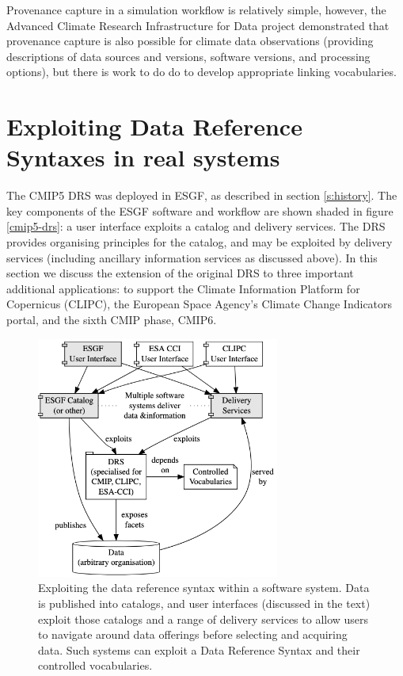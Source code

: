 \documentclass[final,1p,times,twocolumn,authoryear]{elsarticle}
\begin{document}
Provenance capture in a simulation workflow is relatively simple, however,
the Advanced Climate Research Infrastructure for Data \citep[ACRID, ][]{Shaon2012} project demonstrated that provenance capture is also possible for climate data observations (providing descriptions of data sources and versions, software versions, and processing options), but there is work to do do to develop appropriate linking vocabularies.
 

\section{Exploiting Data Reference Syntaxes in real systems}

The CMIP5 DRS was deployed in ESGF, as described in section \ref{s:history}. The key components of the ESGF software and workflow are shown shaded in figure \ref{cmip5-drs}: a user interface exploits a catalog and delivery services. 
The DRS provides organising principles for the catalog, and may be exploited by delivery services (including ancillary information services as discussed above).
In this section we discuss the extension of the original DRS to three important additional applications: to support the Climate Information Platform for Copernicus (CLIPC), the European Space Agency's Climate Change Indicators portal, and the sixth CMIP phase, CMIP6.

\begin{figure}
\centerline{\includegraphics[width=8cm]{figs/architecture_v3.png}}
\caption{Exploiting the data reference syntax within a software system.  Data is published into catalogs, and user interfaces (discussed in the text) exploit those catalogs and a range of delivery services to allow users to navigate around data offerings before selecting and acquiring data. Such systems can exploit a Data Reference Syntax and their controlled vocabularies. \label{fig:arch}}
\end{figure} 
\end{document}
